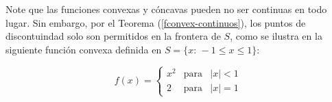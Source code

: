 
Note que las funciones convexas y c\'oncavas pueden no ser continuas en todo lugar. Sin embargo, por el Teorema (\ref{fconvex-continuos}), 
los puntos de discontuindad solo son permitidos en la frontera de $S$, como se ilustra en la siguiente funci\'on convexa definida en 
$S = \{ x:\, -1 \leqslant x \leqslant 1 \}$:

\[f(x) = \displaystyle{\left \{ \begin{array}{lcl}
                                  x^2 &\mbox{para}& |x| < 1\\
                                  2 &\mbox{para}& |x| = 1
                               \end{array}
\right.}\]











